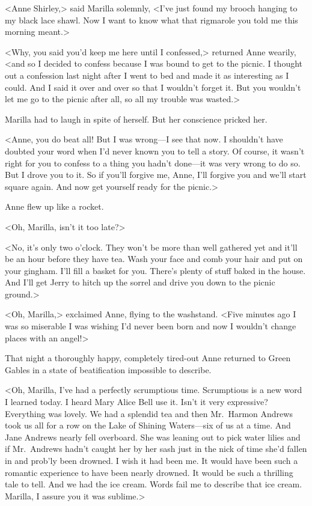 <Anne Shirley,> said Marilla solemnly, <I've just found my brooch hanging to my black lace shawl. Now I want to know what that rigmarole you told me this morning meant.>

<Why, you said you'd keep me here until I confessed,> returned Anne wearily, <and so I decided to confess because I was bound to get to the picnic. I thought out a confession last night after I went to bed and made it as interesting as I could. And I said it over and over so that I wouldn't forget it. But you wouldn't let me go to the picnic after all, so all my trouble was wasted.>

Marilla had to laugh in spite of herself. But her conscience pricked her.

<Anne, you do beat all! But I was wrong—I see that now. I shouldn't have doubted your word when I'd never known you to tell a story. Of course, it wasn't right for you to confess to a thing you hadn't done—it was very wrong to do so. But I drove you to it. So if you'll forgive me, Anne, I'll forgive you and we'll start square again. And now get yourself ready for the picnic.>

Anne flew up like a rocket.

<Oh, Marilla, isn't it too late?>

<No, it's only two o'clock. They won't be more than well gathered yet and it'll be an hour before they have tea. Wash your face and comb your hair and put on your gingham. I'll fill a basket for you. There's plenty of stuff baked in the house. And I'll get Jerry to hitch up the sorrel and drive you down to the picnic ground.>

<Oh, Marilla,> exclaimed Anne, flying to the washstand. <Five minutes ago I was so miserable I was wishing I'd never been born and now I wouldn't change places with an angel!>

That night a thoroughly happy, completely tired-out Anne returned to Green Gables in a state of beatification impossible to describe.

<Oh, Marilla, I've had a perfectly scrumptious time. Scrumptious is a new word I learned today. I heard Mary Alice Bell use it. Isn't it very expressive? Everything was lovely. We had a splendid tea and then Mr.~Harmon Andrews took us all for a row on the Lake of Shining Waters—six of us at a time. And Jane Andrews nearly fell overboard. She was leaning out to pick water lilies and if Mr.~Andrews hadn't caught her by her sash just in the nick of time she'd fallen in and prob'ly been drowned. I wish it had been me. It would have been such a romantic experience to have been nearly drowned. It would be such a thrilling tale to tell. And we had the ice cream. Words fail me to describe that ice cream. Marilla, I assure you it was sublime.>

